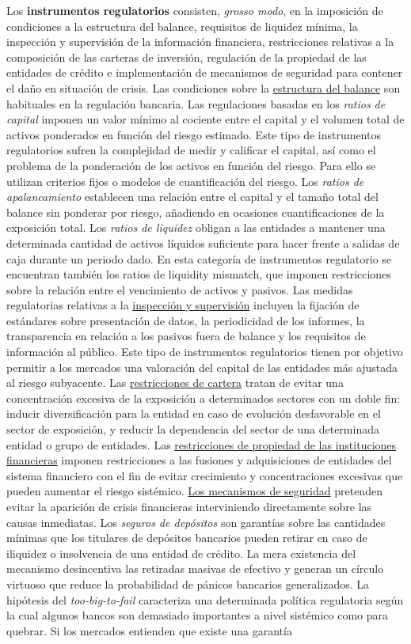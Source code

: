 \documentclass{nuevotema}
\begin{document}
Los \textbf{instrumentos regulatorios} consisten, \textit{grosso modo}, en la imposición de condiciones a la estructura del balance, requisitos de liquidez mínima, la inspección y supervisión de la información financiera, restricciones relativas a la composición de las carteras de inversión, regulación de la propiedad de las entidades de crédito e implementación de mecanismos de seguridad para contener el daño en situación de crisis. Las condiciones sobre la \underline{estructura del balance} son habituales en la regulación bancaria. Las regulaciones basadas en los \textit{ratios de capital} imponen un valor mínimo al cociente entre el capital y el volumen total de activos ponderados en función del riesgo estimado. Este tipo de instrumentos regulatorios sufren la complejidad de medir y calificar el capital, así como el problema de la ponderación de los activos en función del riesgo. Para ello se utilizan criterios fijos o modelos de cuantificación del riesgo. Los \textit{ratios de apalancamiento} establecen una relación entre el capital y el tamaño total del balance sin ponderar por riesgo, añadiendo en ocasiones cuantificaciones de la exposición total. Los \textit{ratios de liquidez} obligan a las entidades a mantener una determinada cantidad de activos líquidos suficiente para hacer frente a salidas de caja durante un periodo dado. En esta categoría de instrumentos regulatorio se encuentran también los ratios de liquidity mismatch, que imponen restricciones sobre la relación entre el vencimiento de activos y pasivos. Las medidas regulatorias relativas a la \underline{inspección y supervisión} incluyen la fijación de estándares sobre presentación de datos, la periodicidad de los informes, la transparencia en relación a los pasivos fuera de balance y los requisitos de información al público. Este tipo de instrumentos regulatorios tienen por objetivo permitir a los mercados una valoración del capital de las entidades más ajustada al riesgo subyacente. Las \underline{restricciones de cartera} tratan de evitar una concentración excesiva de la exposición a determinados sectores con un doble fin: inducir diversificación para la entidad en caso de evolución desfavorable en el sector de exposición, y reducir la dependencia del sector de una determinada entidad o grupo de entidades. Las \underline{restricciones de propiedad de las instituciones financieras} imponen restricciones a las fusiones y adquisiciones de entidades del sistema financiero con el fin de evitar crecimiento y concentraciones excesivas que pueden aumentar el riesgo sistémico. \underline{Los mecanismos de seguridad} pretenden evitar la aparición de crisis financieras interviniendo directamente sobre las causas inmediatas. Los \textit{seguros de depósitos} son garantías sobre las cantidades mínimas que los titulares de depósitos bancarios pueden retirar en caso de iliquidez o insolvencia de una entidad de crédito. La mera existencia del mecanismo desincentiva las retiradas masivas de efectivo y generan un círculo virtuoso que reduce la probabilidad de pánicos bancarios generalizados. La hipótesis del \textit{too-big-to-fail} caracteriza una determinada política regulatoria según la cual algunos bancos son demasiado importantes a nivel sistémico como para quebrar. Si los mercados entienden que existe una garantía 
\end{document}

